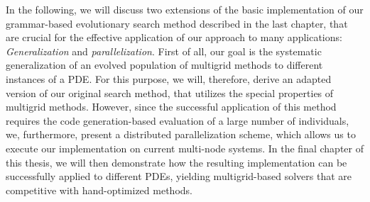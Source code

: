 In the following, we will discuss two extensions of the basic implementation of our grammar-based evolutionary search method described in the last chapter, that are crucial for the effective application of our approach to many applications: \emph{Generalization} and \emph{parallelization}.  
First of all, our goal is the systematic generalization of an evolved population of multigrid methods to different instances of a PDE.
For this purpose, we will, therefore, derive an adapted version of our original search method, that utilizes the special properties of multigrid methods.
However, since the successful application of this method requires the code generation-based evaluation of a large number of individuals, we, furthermore, present a distributed parallelization scheme, which allows us to execute our implementation on current multi-node systems.
In the final chapter of this thesis, we will then demonstrate how the resulting implementation can be successfully applied to different PDEs, yielding multigrid-based solvers that are competitive with hand-optimized methods. 

